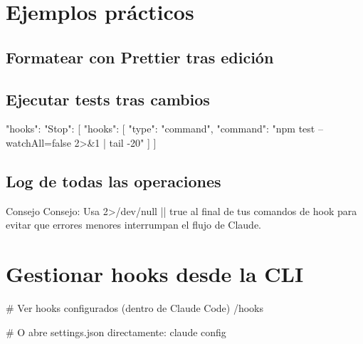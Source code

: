 \documentclass[11pt,a4paper]{report}
\begin{document}
\section{Ejemplos prácticos}

\subsection{Formatear con Prettier tras edición}


\subsection{Ejecutar tests tras cambios}

\begin{codebox}
{
  "hooks": {
    "Stop": [{
      "hooks": [{
        "type": "command",
        "command": "npm test --watchAll=false 2>&1 | tail -20"
      }]
    }]
  }
}
\end{codebox}

\subsection{Log de todas las operaciones}


\begin{calloutbox}{Consejo}
Consejo: Usa 2>/dev/null || true al final de tus comandos de hook para evitar que errores menores interrumpan el flujo de Claude.\end{calloutbox}

\section{Gestionar hooks desde la CLI}

\begin{codebox}
# Ver hooks configurados (dentro de Claude Code)
/hooks

# O abre settings.json directamente:
claude config
\end{codebox}
\end{document}
